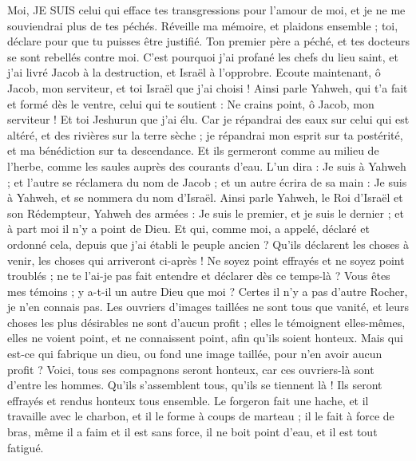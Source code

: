 \begin{multicols}{2}
Moi, JE SUIS celui qui efface tes transgressions pour l'amour de moi, et je ne me souviendrai plus de tes péchés.
Réveille ma mémoire, et plaidons ensemble ; toi, déclare pour que tu puisses être justifié.
Ton premier père a péché, et tes docteurs se sont rebellés contre moi.
C'est pourquoi j'ai profané les chefs du lieu saint, et j'ai livré Jacob à la destruction, et Israël à l'opprobre.
\VerseOne{}Ecoute maintenant, ô Jacob, mon serviteur, et toi Israël que j'ai choisi !
Ainsi parle Yahweh, qui t'a fait et formé dès le ventre, celui qui te soutient : Ne crains point, ô Jacob, mon serviteur ! Et toi Jeshurun que j'ai élu.
Car je répandrai des eaux sur celui qui est altéré, et des rivières sur la terre sèche ; je répandrai mon esprit sur ta postérité, et ma bénédiction sur ta descendance.
Et ils germeront comme au milieu de l'herbe, comme les saules auprès des courants d'eau.
L'un dira : Je suis à Yahweh ; et l'autre se réclamera du nom de Jacob ; et un autre écrira de sa main : Je suis à Yahweh, et se nommera du nom d'Israël.
Ainsi parle Yahweh, le Roi d'Israël et son Rédempteur, Yahweh des armées : Je suis le premier, et je suis le dernier ; et à part moi il n'y a point de Dieu.
Et qui, comme moi, a appelé, déclaré et ordonné cela, depuis que j'ai établi le peuple ancien ? Qu'ils déclarent les choses à venir, les choses qui arriveront ci-après !
Ne soyez point effrayés et ne soyez point troublés ; ne te l'ai-je pas fait entendre et déclarer dès ce temps-là ? Vous êtes mes témoins ; y a-t-il un autre Dieu que moi ? Certes il n'y a pas d'autre Rocher, je n'en connais pas.
Les ouvriers d'images taillées ne sont tous que vanité, et leurs choses les plus désirables ne sont d'aucun profit ; elles le témoignent elles-mêmes, elles ne voient point, et ne connaissent point, afin qu'ils soient honteux.
Mais qui est-ce qui fabrique un dieu, ou fond une image taillée, pour n'en avoir aucun profit ?
Voici, tous ses compagnons seront honteux, car ces ouvriers-là sont d'entre les hommes. Qu'ils s'assemblent tous, qu'ils se tiennent là ! Ils seront effrayés et rendus honteux tous ensemble.
Le forgeron fait une hache, et il travaille avec le charbon, et il le forme à coups de marteau ; il le fait à force de bras, même il a faim et il est sans force, il ne boit point d'eau, et il est tout fatigué.

\end{multicols}
